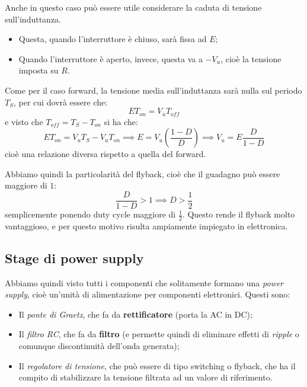 \documentclass[a4paper,11pt]{article}
\begin{document}
Anche in questo caso può essere utile considerare la caduta di tensione sull'induttanza.
\begin{itemize}
	\item Questa, quando l'interruttore è chiuso, sarà fissa ad $E$;
	\item Quando l'interruttore è aperto, invece, questa va a $-{V}_u$, cioè la tensione imposta su $R$.
\end{itemize}

Come per il caso forward, la tensione media sull'induttanza sarà nulla sul periodo $T_S$, per cui dovrà essere che:
$$
E T_{on} = V_u T_{off}
$$
e visto che $T_{off} = T_S - T_{on}$ si ha che:
$$
E T_{on} = V_u T_S - V_u T_{on} \implies E = V_u \left( \frac{1 - D}{D} \right) \implies V_u = E \frac{D}{1 - D}
$$
cioè una relazione diversa rispetto a quella del forward.

Abbiamo quindi la particolarità del flyback, cioè che il guadagno può essere maggiore di $1$:
$$
\frac{D}{1 - D} > 1 \implies D > \frac{1}{2}
$$
semplicemente ponendo duty cycle maggiore di $\frac{1}{2}$. Questo rende il flyback molto vantaggioso, e per questo motivo risulta ampiamente impiegato in elettronica.

\subsection{Stage di power supply}
Abbiamo quindi visto tutti i componenti che solitamente formano una \textit{power supply}, cioè un'unità di alimentazione per componenti elettronici. Questi sono:
\begin{itemize}
	\item Il \textit{ponte di Graetz}, che fa da \textbf{rettificatore} (porta la AC in DC);
	\item Il \textit{filtro RC}, che fa da \textbf{filtro} (e permette quindi di eliminare effetti di \textit{ripple} o comunque discontinuità dell'onda generata);
	\item Il \textit{regolatore di tensione}, che può essere di tipo switching o flyback, che ha il compito di stabilizzare la tensione filtrata ad un valore di riferimento.
\end{itemize}
\end{document}

